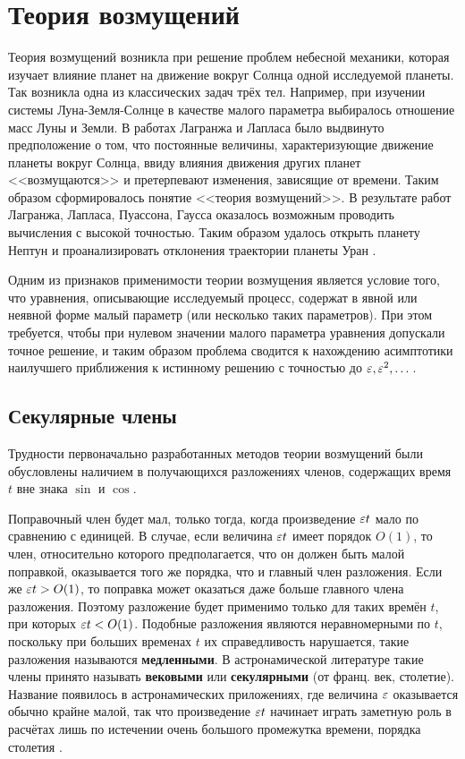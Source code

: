 \chapter*{Теория возмущений}

Теория возмущений возникла при решение
проблем небесной механики,
которая изучает влияние планет
на движение вокруг Солнца одной исследуемой планеты.
Так возникла одна из классических задач трёх тел.
Например, при изучении системы Луна-Земля-Солнце
в качестве малого параметра выбиралось
отношение масс Луны и Земли.
В работах Лагранжа и Лапласа было
выдвинуто предположение о том,
что постоянные величины,
характеризующие движение планеты вокруг Солнца,
ввиду влияния движения других планет <<возмущаются>>
и претерпевают изменения, зависящие от времени.
Таким образом сформировалось понятие <<теория возмущений>>.
В результате работ Лагранжа, Лапласа, Пуассона, Гаусса
оказалось возможным проводить вычисления с высокой точностью.
Таким образом удалось открыть планету Нептун
и проанализировать отклонения траектории планеты Уран \cite{vinogradov1977}.

Одним из признаков применимости теории возмущения
является условие того, что уравнения,
описывающие исследуемый процесс,
содержат в явной или неявной форме малый параметр
(или несколько таких параметров).
При этом требуется, чтобы при нулевом значении
малого параметра уравнения допускали точное решение,
и таким образом проблема сводится к нахождению
асимптотики наилучшего приближения к истинному решению
с точностью до $\varepsilon, \varepsilon^2, \dots$.

\section*{Секулярные члены}

Трудности первоначально разработанных методов теории возмущений
были обусловлены наличием в получающихся разложениях членов,
содержащих время $t$ вне знака $\sin$ и $\cos$.

Поправочный член будет мал,
только тогда, когда произведение $\varepsilon t$
мало по сравнению с единицей.
В случае, если величина $\varepsilon t$
имеет порядок $O(1)$, то член,
относительно которого предполагается,
что он должен быть малой поправкой,
оказывается того же порядка,
что и главный член разложения.
Если же $\varepsilon t > O(1)$,
то поправка может оказаться
даже больше главного члена разложения.
Поэтому разложение будет применимо только
для таких времён $t$, при которых $\varepsilon t < O(1)$.
Подобные разложения являются неравномерными по $t$,
поскольку при больших временах $t$ их справедливость нарушается,
такие разложения называются \textbf{медленными}.
В астронамической литературе такие члены
принято называть \textbf{вековыми} или
\textbf{секулярными} (от франц. век, столетие).
Название появилось в астронамических приложениях,
где величина $\varepsilon$ оказывается обычно крайне малой,
так что произведение $\varepsilon t$ начинает играть
заметную роль в расчётах лишь по истечении
очень большого промежутка времени, порядка столетия
\cite{nayfeh1984}.

